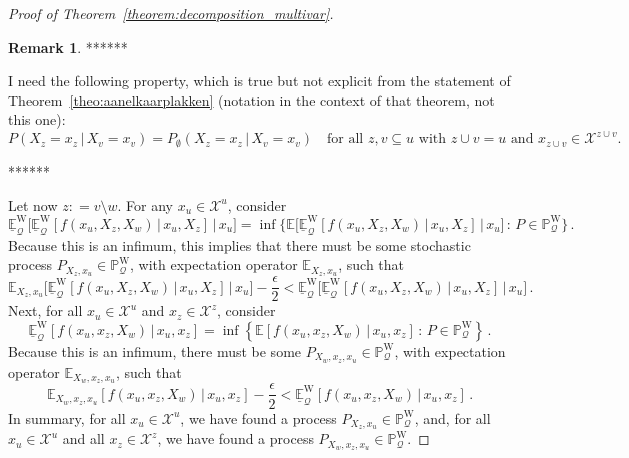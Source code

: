 \documentclass[10pt]{paper}
\theoremstyle{definition}
\newtheorem{remark}{Remark}
\newcommand{\states}{\mathcal{X}}
\newcommand{\processes}{\mathbb{P}}
\newcommand{\wprocesses}{\processes^{\mathrm{W}}}
\newcommand{\rateset}{\mathcal{Q}}
\newcommand{\coloneqq}{:\!=}
\begin{document}
\begin{proof}[Proof of Theorem~\ref{theorem:decomposition_multivar}]
\begin{remark}
******

I need the following property, which is true but not explicit from the statement of Theorem~\ref{theo:aanelkaarplakken} (notation in the context of that theorem, not this one):
\begin{equation*}
P(X_z=x_z\,\vert\,X_v=x_v) = P_\emptyset(X_z=x_z\,\vert\,X_v=x_v)\quad\text{for all $z,v\subseteq u$ with $z\cup v=u$ and $x_{z\cup v}\in\states^{z\cup v}$.}
\end{equation*}

******
\end{remark}
Let now $z\coloneqq v\setminus w$. For any $x_u\in\states^u$, consider
\begin{equation*}
\underline{\mathbb{E}}^{\mathrm{W}}_\rateset\bigl[\underline{\mathbb{E}}^{\mathrm{W}}_\rateset[f(x_u,X_z,X_w)\,\vert\,x_u,X_z]\,\big\vert\,x_u\bigr] = \inf\{\mathbb{E}\bigl[\underline{\mathbb{E}}^{\mathrm{W}}_\rateset[f(x_u,X_z,X_w)\,\vert\,x_u,X_z]\,\big\vert\,x_u\bigr]\,:\,P\in\wprocesses_\rateset\}\,.
\end{equation*}
Because this is an infimum, this implies that there must be some stochastic process $P_{X_z,x_u}\in\wprocesses_\rateset$, with expectation operator $\mathbb{E}_{X_z,x_u}$, such that
\begin{equation*}
\mathbb{E}_{X_z,x_u}\bigl[\underline{\mathbb{E}}^{\mathrm{W}}_\rateset[f(x_u,X_z,X_w)\,\vert\,x_u,X_z]\,\big\vert\,x_u\bigr] - \frac{\epsilon}{2} < \underline{\mathbb{E}}^{\mathrm{W}}_\rateset\bigl[\underline{\mathbb{E}}^{\mathrm{W}}_\rateset[f(x_u,X_z,X_w)\,\vert\,x_u,X_z]\,\big\vert\,x_u\bigr]\,.
\end{equation*}
Next, for all $x_u\in\states^u$ and $x_{z}\in\states^z$, consider
\begin{equation*}
\underline{\mathbb{E}}^{\mathrm{W}}_\rateset\left[f(x_u,x_z,X_w)\,\vert\,x_u,x_z\right] = \inf\left\{\mathbb{E}\left[f(x_u,x_z,X_w)\,\vert\,x_u,x_z\right] \,:\, P\in\wprocesses_\rateset\right\}\,.
\end{equation*}
Because this is an infimum, there must be some $P_{X_w,x_z,x_u}\in\wprocesses_\rateset$, with expectation operator $\mathbb{E}_{X_w,x_z,x_u}$, such that
\begin{equation*}
\mathbb{E}_{X_w,x_z,x_u}\left[f(x_u,x_z,X_w)\,\vert\,x_u,x_z\right] - \frac{\epsilon}{2} < \underline{\mathbb{E}}^{\mathrm{W}}_\rateset\left[f(x_u,x_z,X_w)\,\vert\,x_u,x_z\right]\,.
\end{equation*}
In summary, for all $x_u\in\states^u$, we have found a process $P_{X_z,x_u}\in\wprocesses_\rateset$, and, for all $x_u\in\states^u$ and all $x_z\in\states^z$, we have found a process $P_{X_w,x_z,x_u}\in\wprocesses_\rateset$.


\end{proof}
\end{document}
